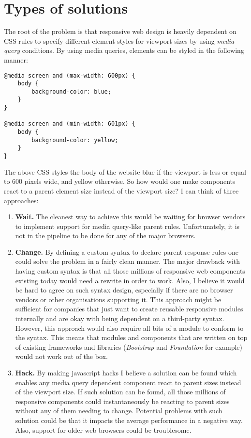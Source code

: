 \documentclass[oneside,a4paper,11pt]{kth-mag}
\begin{document}
\section*{Types of solutions}
The root of the problem is that responsive web design is heavily dependent on CSS rules to specify different element styles for viewport sizes by using \emph{media query} conditions. By using media queries, elements can be styled in the following manner:
\begin{lstlisting}[frame=single]
@media screen and (max-width: 600px) {
    body {
        background-color: blue;
    }
}

@media screen and (min-width: 601px) {
    body {
        background-color: yellow;
    }
}
\end{lstlisting}
The above CSS styles the body of the website blue if the viewport is less or equal to 600 pixels wide, and yellow otherwise. So how would one make components react to a parent element size instead of the viewport size? I can think of three approaches:
\begin{enumerate}
	\item \textbf{Wait.} The cleanest way to achieve this would be waiting for browser vendors to implement support for media query-like parent rules. Unfortunately, it is not in the pipeline to be done for any of the major browsers.
	\item \textbf{Change.} By defining a custom syntax to declare parent response rules one could solve the problem in a fairly clean manner. The major drawback with having custom syntax is that all those millions of responsive web components existing today would need a rewrite in order to work. Also, I believe it would be hard to agree on such syntax design, especially if there are no browser vendors or other organisations supporting it. This approach might be sufficient for companies that just want to create reusable responsive modules internally and are okay with being dependent on a third-party syntax. However, this approach would also require all bits of a module to conform to the syntax. This means that modules and components that are written on top of existing frameworks and libraries (\emph{Bootstrap} and \emph{Foundation} for example) would not work out of the box.
	\item \textbf{Hack.} By making javascript hacks I believe a solution can be found which enables any media query dependent component react to parent sizes instead of the viewport size. If such solution can be found, all those millions of responsive components could instantaneously be reacting to parent sizes without any of them needing to change. Potential problems with such solution could be that it impacts the average performance in a negative way. Also, support for older web browsers could be troublesome.
\end{enumerate}
\end{document}

